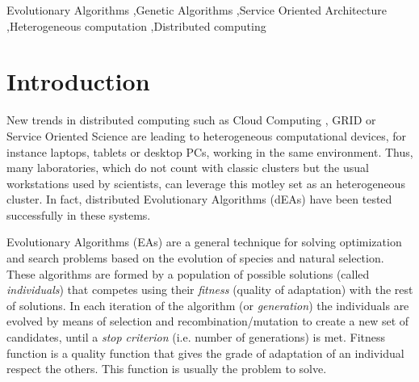 \documentclass[final,1p,times]{elsarticle}
\begin{document}
\begin{frontmatter}
\begin{abstract}
\end{abstract}

\begin{keyword}
Evolutionary Algorithms \sep Genetic Algorithms \sep Service Oriented Architecture \sep Heterogeneous computation \sep Distributed computing
\end{keyword}

\end{frontmatter}

\section{Introduction}
\label{sec:intro}
New trends in distributed computing such as Cloud Computing \cite{CLOUD}, GRID
\cite{OPENSCIENCEGRID} or Service Oriented Science \cite{GLOBUS} are
leading to heterogeneous computational devices,  for instance laptops,
tablets or desktop PCs, working in the same
environment. Thus, many laboratories, which do not count with classic
clusters but the usual workstations used by scientists, can leverage
this motley set as an heterogeneous cluster. In fact, distributed Evolutionary
Algorithms (dEAs) \cite{MULTIKULTI,PARALLELGRIDHETEROGENEOUS} have been tested successfully in these
systems.  %

Evolutionary Algorithms (EAs) are a general technique for solving optimization and search problems based on the evolution of species and natural selection. These algorithms are formed by a population of possible solutions (called {\em individuals}) that competes using their {\em fitness} (quality of adaptation) with the rest of solutions. In each iteration of the algorithm (or {\em generation}) the individuals are evolved by means of selection and recombination/mutation to create a new set of candidates, until a {\em stop criterion} (i.e. number of generations) is met. Fitness function is a quality function that gives the grade of adaptation of an individual respect the others. This function is usually the problem to solve. 
\end{document}
